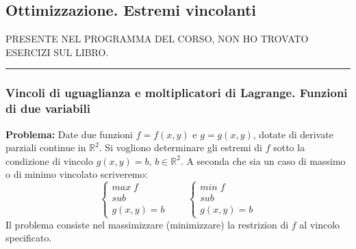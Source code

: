 \subsection*{Ottimizzazione. Estremi vincolanti}
\begin{tcolorbox}
    PRESENTE NEL PROGRAMMA DEL CORSO, NON HO TROVATO ESERCIZI SUL LIBRO.
\end{tcolorbox}
\rule{\textwidth}{0,4pt}
\subsubsection*{Vincoli di uguaglianza e moltiplicatori di Lagrange. Funzioni di due variabili}
\textbf{Problema:} Date due funzioni $f= f(x,y)$ e $g = g(x,y)$, dotate di derivate parziali continue in $\mathbb{R}^2$. Si vogliono determinare gli estremi di $f$ sotto la condizione di vincolo $g(x,y) = b$, $b \in \mathbb{R}^2$.\newline
A seconda che sia un caso di massimo o di minimo vincolato scriveremo:
\[
    \begin{cases}
        max \; f\\
        sub\\
        g(x,y) = b
    \end{cases}\quad \quad \begin{cases}
        min \; f \\
        sub\\
        g(x,y) = b
    \end{cases}
\]
Il problema consiste nel massimizzare (minimizzare) la restrizion di $f$ al vincolo specificato.\newline
